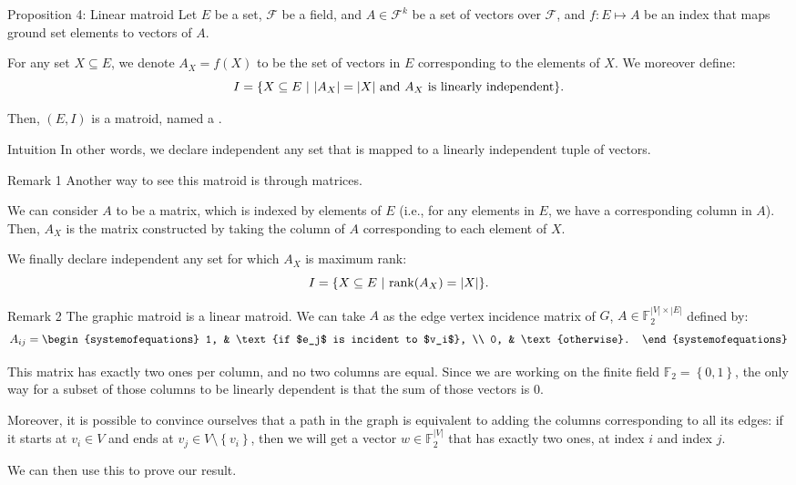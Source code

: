 \documentclass[a4paper]{article}
\begin{document}
\begin{parag}{Proposition 4: Linear matroid}
    Let $E$ be a set, $\mathcal{F}$ be a field, and $A \in \mathcal{F}^k$ be a set of vectors over $\mathcal{F}$, and $f: E \mapsto A$ be an index that maps ground set elements to vectors of $A$.

    For any set $X \subseteq E$, we denote $A_X = f\left(X\right)$ to be the set of vectors in $E$ corresponding to the elements of $X$. We moreover define:
    \[I = \left\{X \subseteq E \suchthat \left|A_X\right| = \left|X\right| \text{ and } A_X \text{ is linearly independent} \right\}.\]

    Then, $\left(E, I\right)$ is a matroid, named a .

    \begin{subparag}{Intuition}
        In other words, we declare independent any set that is mapped to a linearly independent tuple of vectors.
    \end{subparag}

    \begin{subparag}{Remark 1}
        Another way to see this matroid is through matrices.

        We can consider $A$ to be a matrix, which is indexed by elements of $E$ (i.e., for any elements in $E$, we have a corresponding column in $A$). Then, $A_X$ is the matrix constructed by taking the column of $A$ corresponding to each element of $X$.

        We finally declare independent any set for which $A_X$ is maximum rank:
        \[I = \left\{X \subseteq E \suchthat \rank\left(A_X\right) = \left|X\right|\right\}.\]
    \end{subparag}
    
    \begin{subparag}{Remark 2}
        The graphic matroid is a linear matroid. We can take $A$ as the edge vertex incidence matrix of $G$, $A \in \mathbb{F}_2^{\left|V\right| \times \left|E\right|}$ defined by:
        \[A_{ij} = \begin{systemofequations} 1, & \text{if $e_j$ is incident to $v_i$}, \\ 0, & \text{otherwise}. \end{systemofequations}\]

        This matrix has exactly two ones per column, and no two columns are equal. Since we are working on the finite field $\mathbb{F}_2 = \left\{0, 1\right\}$, the only way for a subset of those columns to be linearly dependent is that the sum of those vectors is $0$. 

        Moreover, it is possible to convince ourselves that a path in the graph is equivalent to adding the columns corresponding to all its edges: if it starts at $v_i \in V$ and ends at $v_j \in V \setminus \left\{v_i\right\}$, then we will get a vector $w \in \mathbb{F}_2^{\left|V\right|}$ that has exactly two ones, at index $i$ and index $j$.

        We can then use this to prove our result.
    \end{subparag}
\end{parag}
\end{document}
